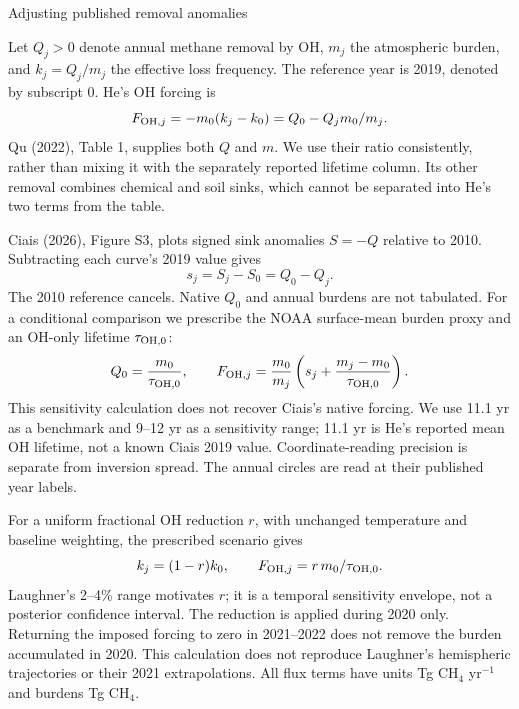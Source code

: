 \documentclass[11pt]{article}
\begin{document}
\begin{center}\large Adjusting published removal anomalies\end{center}
Let $Q_j>0$ denote annual methane removal by OH, $m_j$ the atmospheric
burden, and $k_j=Q_j/m_j$ the effective loss frequency. The reference year is
2019, denoted by subscript 0. He's OH forcing is
\begin{equation}
F_{{\rm OH},j}=-m_0(k_j-k_0)=Q_0-Q_jm_0/m_j.
\end{equation}
Qu (2022), Table 1, supplies both $Q$ and $m$. We use their ratio consistently,
rather than mixing it with the separately reported lifetime column. Its other
removal combines chemical and soil sinks, which cannot be separated into
He's two terms from the table.

Ciais (2026), Figure S3, plots signed sink anomalies $S=-Q$ relative to 2010.
Subtracting each curve's 2019 value gives
\begin{equation}
s_j=S_j-S_0=Q_0-Q_j.
\end{equation}
The 2010 reference cancels. Native $Q_0$ and annual burdens are not tabulated.
For a conditional comparison we prescribe the NOAA surface-mean burden proxy
and an OH-only lifetime $\tau_{{\rm OH},0}$:
\begin{equation}
Q_0=\frac{m_0}{\tau_{{\rm OH},0}},\qquad
F_{{\rm OH},j}=\frac{m_0}{m_j}
\left(s_j+\frac{m_j-m_0}{\tau_{{\rm OH},0}}\right).
\end{equation}
This sensitivity calculation does not recover Ciais's native forcing. We use
11.1 yr as a benchmark and 9--12 yr as a sensitivity range; 11.1 yr is He's
reported mean OH lifetime, not a known Ciais 2019 value. Coordinate-reading
precision is separate from inversion spread. The annual circles are read
at their published year labels.

For a uniform fractional OH reduction $r$, with unchanged temperature and
baseline weighting, the prescribed scenario gives
\begin{equation}
k_j=(1-r)k_0,\qquad F_{{\rm OH},j}=r\,m_0/\tau_{{\rm OH},0}.
\end{equation}
Laughner's 2--4\% range motivates $r$; it is a temporal sensitivity envelope,
not a posterior confidence interval. The reduction is applied during 2020
only. Returning the imposed forcing to zero in 2021--2022 does not remove
the burden accumulated in 2020. This calculation does not reproduce
Laughner's hemispheric trajectories or their 2021 extrapolations.
All flux terms have units Tg CH$_4$ yr$^{-1}$ and burdens Tg CH$_4$.
\end{document}
